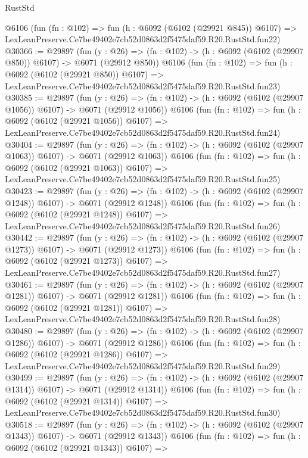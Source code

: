 \begin{lexlean}{RustStd}
\begin{coremodule}
    @6106
    (fun (fn : @102) =>
    fun (h : @6092 (@6102 (@29921 @845)) @6107) =>
    LexLeanPreserve.Ce7be49402e7cb52d0863d2f5475daf59.R20.RustStd.fun22)
@30366 := @29897
    (fun (y : @26) => (fn : @102) -> (h : @6092 (@6102 (@29907 @850)) @6107) -> @6071 (@29912 @850))
    @6106
    (fun (fn : @102) =>
    fun (h : @6092 (@6102 (@29921 @850)) @6107) =>
    LexLeanPreserve.Ce7be49402e7cb52d0863d2f5475daf59.R20.RustStd.fun23)
@30385 := @29897
    (fun (y : @26) =>
    (fn : @102) -> (h : @6092 (@6102 (@29907 @1056)) @6107) -> @6071 (@29912 @1056))
    @6106
    (fun (fn : @102) =>
    fun (h : @6092 (@6102 (@29921 @1056)) @6107) =>
    LexLeanPreserve.Ce7be49402e7cb52d0863d2f5475daf59.R20.RustStd.fun24)
@30404 := @29897
    (fun (y : @26) =>
    (fn : @102) -> (h : @6092 (@6102 (@29907 @1063)) @6107) -> @6071 (@29912 @1063))
    @6106
    (fun (fn : @102) =>
    fun (h : @6092 (@6102 (@29921 @1063)) @6107) =>
    LexLeanPreserve.Ce7be49402e7cb52d0863d2f5475daf59.R20.RustStd.fun25)
@30423 := @29897
    (fun (y : @26) =>
    (fn : @102) -> (h : @6092 (@6102 (@29907 @1248)) @6107) -> @6071 (@29912 @1248))
    @6106
    (fun (fn : @102) =>
    fun (h : @6092 (@6102 (@29921 @1248)) @6107) =>
    LexLeanPreserve.Ce7be49402e7cb52d0863d2f5475daf59.R20.RustStd.fun26)
@30442 := @29897
    (fun (y : @26) =>
    (fn : @102) -> (h : @6092 (@6102 (@29907 @1273)) @6107) -> @6071 (@29912 @1273))
    @6106
    (fun (fn : @102) =>
    fun (h : @6092 (@6102 (@29921 @1273)) @6107) =>
    LexLeanPreserve.Ce7be49402e7cb52d0863d2f5475daf59.R20.RustStd.fun27)
@30461 := @29897
    (fun (y : @26) =>
    (fn : @102) -> (h : @6092 (@6102 (@29907 @1281)) @6107) -> @6071 (@29912 @1281))
    @6106
    (fun (fn : @102) =>
    fun (h : @6092 (@6102 (@29921 @1281)) @6107) =>
    LexLeanPreserve.Ce7be49402e7cb52d0863d2f5475daf59.R20.RustStd.fun28)
@30480 := @29897
    (fun (y : @26) =>
    (fn : @102) -> (h : @6092 (@6102 (@29907 @1286)) @6107) -> @6071 (@29912 @1286))
    @6106
    (fun (fn : @102) =>
    fun (h : @6092 (@6102 (@29921 @1286)) @6107) =>
    LexLeanPreserve.Ce7be49402e7cb52d0863d2f5475daf59.R20.RustStd.fun29)
@30499 := @29897
    (fun (y : @26) =>
    (fn : @102) -> (h : @6092 (@6102 (@29907 @1314)) @6107) -> @6071 (@29912 @1314))
    @6106
    (fun (fn : @102) =>
    fun (h : @6092 (@6102 (@29921 @1314)) @6107) =>
    LexLeanPreserve.Ce7be49402e7cb52d0863d2f5475daf59.R20.RustStd.fun30)
@30518 := @29897
    (fun (y : @26) =>
    (fn : @102) -> (h : @6092 (@6102 (@29907 @1343)) @6107) -> @6071 (@29912 @1343))
    @6106
    (fun (fn : @102) =>
    fun (h : @6092 (@6102 (@29921 @1343)) @6107) =>

\end{coremodule}
\end{lexlean}
